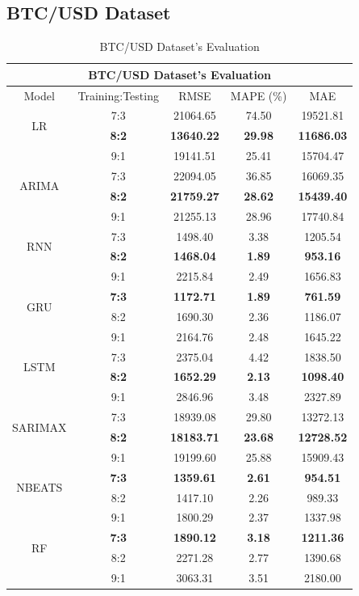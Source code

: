 \documentclass{ieeeojies}
\begin{document}
\subsection{BTC/USD Dataset}
\begin{table}[H]
	\centering
	\begin{tabular}{|c|c|c|c|c|}
		\hline
		\multicolumn{5}{|c|}{\textbf{BTC/USD Dataset's Evaluation}}\\
		\hline
		\centering Model & Training:Testing & RMSE & MAPE (\%) & MAE\\
		\hline
		\multirow{2}{*}{LR} & 7:3 & 21064.65 &  74.50 &  19521.81 \\ & \textbf{8:2} & \textbf{13640.22} &  \textbf{29.98} &  \textbf{11686.03} \\ & 9:1 & 19141.51 & 25.41 & 15704.47\\
		\hline
		\multirow{2}{*}{ARIMA} & 7:3 & 22094.05 & 36.85 & 16069.35 \\ & \textbf{8:2} & \textbf{21759.27}& \textbf{28.62} & \textbf{15439.40} \\ & 9:1 & 21255.13 & 28.96 & 17740.84\\
		\hline
		\multirow{2}{*}{RNN} & 7:3& 1498.40 &  3.38 & 1205.54\\ & \textbf{8:2}& \textbf{1468.04} & \textbf{1.89} & \textbf{953.16} \\ & 9:1 & 2215.84 & 2.49& 1656.83\\
		\hline
		\multirow{2}{*}{GRU} & \textbf{7:3}	&  \textbf{1172.71} & \textbf{1.89} & \textbf{761.59} \\ & 8:2 & 1690.30 & 2.36 &  1186.07 \\ & 9:1 & 2164.76  & 2.48 & 1645.22\\
		\hline
		\multirow{2}{*}{LSTM} & 7:3 &  2375.04 &  4.42 & 1838.50 \\ & \textbf{8:2} &  \textbf{1652.29} & \textbf{2.13} &  \textbf{1098.40} \\ & 9:1 & 2846.96  & 3.48 & 2327.89\\
		\hline
		\multirow{2}{*}{SARIMAX} & 7:3	& 18939.08 & 29.80 & 13272.13 \\ & \textbf{8:2} & \textbf{18183.71} & \textbf{23.68} & \textbf{12728.52} \\ & 9:1 & 19199.60 & 25.88 & 15909.43\\
		\hline
		\multirow{2}{*}{NBEATS} & \textbf{7:3} & \textbf{1359.61} & \textbf{2.61} & \textbf{954.51} \\ & 8:2 & 1417.10 & 2.26 & 989.33 \\ & 9:1 & 1800.29	& 2.37 & 1337.98 \\
		\hline
		\multirow{2}{*}{RF} & \textbf{7:3} & \textbf{1890.12} & \textbf{3.18} & \textbf{1211.36} \\ & 8:2 & 2271.28 & 2.77 & 1390.68 \\ & 9:1 & 3063.31 & 3.51 & 2180.00 \\
		\hline
	\end{tabular}
	\caption{BTC/USD Dataset's Evaluation}
	\label{btcresult}
\end{table}
\end{document}

